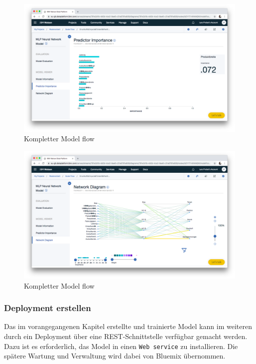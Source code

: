 \begin{figure}[h]
    \centering
    \includegraphics[scale=0.26]{images/kapitel_3/model_predictor.png}
    \caption{Kompletter Model flow}
    \label{fig:umsetzung_model_flow}
\end{figure}

\begin{figure}[h]
    \centering
    \includegraphics[scale=0.26]{images/kapitel_3/model_network_diagram.png}
    \caption{Kompletter Model flow}
    \label{fig:umsetzung_model_flow}
\end{figure}

\subsubsection{Deployment erstellen}
Das im vorangegangenen Kapitel erstellte und trainierte Model kann im weiteren durch ein Deployment über eine
REST-Schnittstelle verfügbar gemacht werden. Dazu ist es erforderlich, das Model in einen \texttt{Web service} zu
installieren. Die spätere Wartung und Verwaltung wird dabei von Bluemix übernommen.

